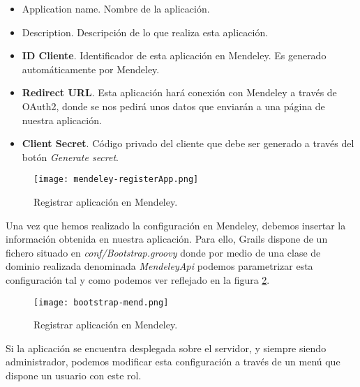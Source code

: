 \begin{itemize}
	\item Application name. Nombre de la aplicación.
	\item Description. Descripción de lo que realiza esta aplicación.
	\item \textbf{ID Cliente}. Identificador de esta aplicación en Mendeley. Es generado automáticamente por Mendeley.
	\item \textbf{Redirect URL}. Esta aplicación hará conexión con Mendeley a través de OAuth2, donde se nos pedirá unos datos que enviarán a una página de nuestra aplicación. 
	\item \textbf{Client Secret}. Código privado del cliente que debe ser generado a través del botón \textit{Generate secret}.
\end{itemize}

\begin{figure}[!hpt]
	\begin{center} 
		\texttt{[image: mendeley-registerApp.png]}
		\caption{Registrar aplicación en Mendeley.}
		\label{fig:mend-register}
	\end{center}
\end{figure}

Una vez que hemos realizado la configuración en Mendeley, debemos insertar la información obtenida en nuestra aplicación. Para ello, Grails dispone de un fichero situado en \textit{conf/Bootstrap.groovy} donde por medio de una clase de dominio realizada denominada \textit{MendeleyApi} podemos parametrizar esta configuración tal y como podemos ver reflejado en la figura \ref{fig:bootstrap-mend}.

\begin{figure}[!hpt]
	\begin{center} 
		\texttt{[image: bootstrap-mend.png]}
		\caption{Registrar aplicación en Mendeley.}
		\label{fig:bootstrap-mend}
	\end{center}
\end{figure}

Si la aplicación se encuentra desplegada sobre el servidor, y siempre siendo administrador, podemos modificar esta configuración a través de un menú que dispone un usuario con este rol.

\newpage

